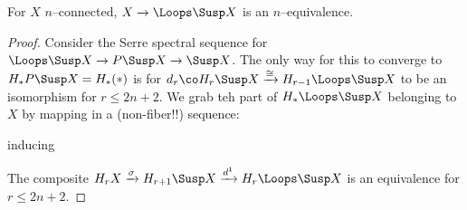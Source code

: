 \begin{theorem}[Freudenthal]
For $X$ $n$--connected, $X \to \Loops \Susp X$ is an $n$--equivalence.
\end{theorem}
\begin{proof}
Consider the Serre spectral sequence for $\Loops \Susp X \to P \Susp X \to \Susp X$.
The only way for this to converge to $H_* P \Susp X = H_*(*)$ is for $d_r\co H_r \Susp X \xrightarrow\cong H_{r-1} \Loops \Susp X$ to be an isomorphism for $r \le 2n+2$.  We grab teh part of $H_* \Loops \Susp X$ belonging to $X$ by mapping in a (non-fiber!!) sequence:
\begin{center}
\end{center}
inducing
\begin{center}
\end{center}
The composite $H_r X \xrightarrow\sigma H_{r+1} \Susp X \xrightarrow{d^1} H_r \Loops \Susp X$ is an equivalence for $r \le 2n+2$.
\end{proof}